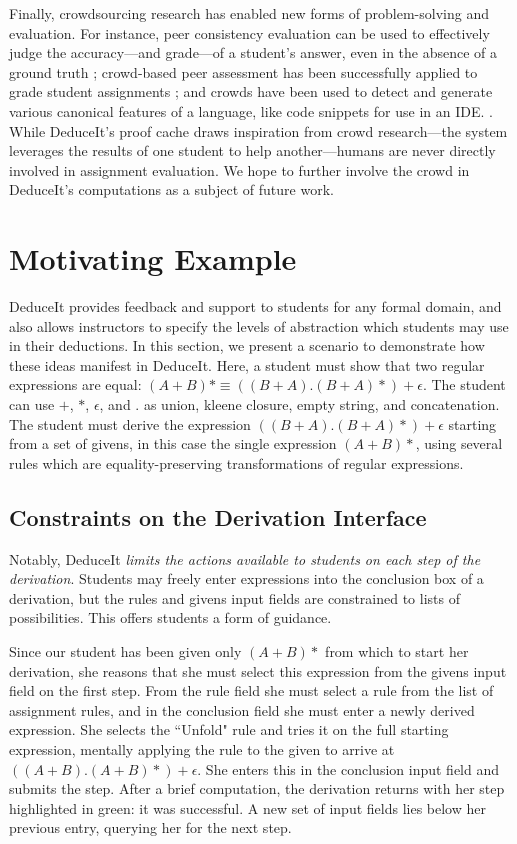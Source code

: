 \documentclass{sigchi}
\begin{document}
Finally, crowdsourcing research has enabled new forms of problem-solving and evaluation. For instance, peer consistency evaluation can be used to effectively judge the accuracy---and grade---of a student's answer, even in the absence of a ground truth \cite{peer-consistency}; crowd-based peer assessment has been successfully applied to grade student assignments \cite{peer-assessment, chinmay-srk}; and crowds have been used to detect and generate various canonical features of a language, like code snippets for use in an IDE. \cite{crowd-snippets}. While DeduceIt's proof cache draws inspiration from crowd research---the system leverages the results of one student to help another---humans are never directly involved in assignment evaluation. We hope to further involve the crowd in DeduceIt's computations as a subject of future work.

\section{Motivating Example}
DeduceIt provides feedback and support to students for any formal domain, and also allows instructors to specify the levels of abstraction which students may use in their deductions. In this section, we present a scenario to demonstrate how these ideas manifest in DeduceIt. Here, a student must show that two regular expressions are equal: $(A+B)* \equiv ((B+A).(B+A)*)+\epsilon$. The student can use $+$, $*$, $\epsilon$, and $.$ as union, kleene closure, empty string, and concatenation. The student must derive the expression $((B+A).(B+A)*)+\epsilon$ starting from a set of givens, in this case the single expression $(A+B)*$, using several rules which are equality-preserving transformations of regular expressions.

\subsection{Constraints on the Derivation Interface}

Notably, DeduceIt \textit{limits the actions available to students on each step of the derivation}. Students may freely enter expressions into the conclusion box of a derivation, but the rules and givens input fields are constrained to lists of possibilities. This offers students a form of guidance.

Since our student has been given only $(A+B)*$ from which to start her derivation, she reasons that she must select this expression from the givens input field on the first step. From the rule field she must select a rule from the list of assignment rules, and in the conclusion field she must enter a newly derived expression. She selects the ``Unfold" rule and tries it on the full starting expression, mentally applying the rule to the given to arrive at $((A + B).(A + B)*)+\epsilon$. She enters this in the conclusion input field and submits the step. After a brief computation, the derivation returns with her step highlighted in green: it was successful. A new set of input fields lies below her previous entry, querying her for the next step.
\end{document}
